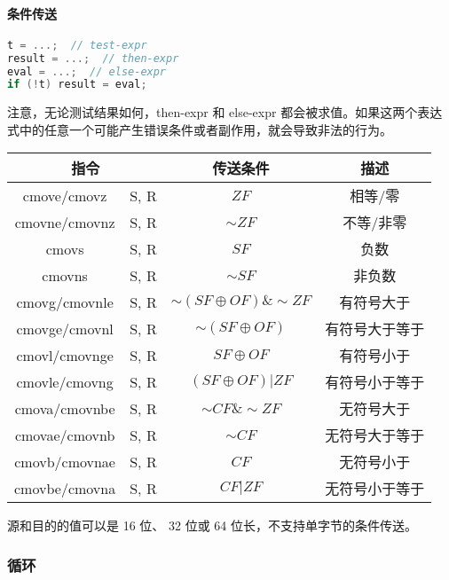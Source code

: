 \paragraph{条件传送}
\begin{lstlisting}[language=C]
t = ...;  // test-expr
result = ...;  // then-expr
eval = ...;  // else-expr
if (!t) result = eval;
\end{lstlisting}

注意，无论测试结果如何，then-expr 和 else-expr 都会被求值。如果这两个表达式中的任意一个可能产生错误条件或者副作用，就会导致非法的行为。

\begin{table}[H]
    \centering
    \begin{tabular}{|c c|c|c|}
        \hline
        \multicolumn{2}{|c|}{\textbf{指令}} & \textbf{传送条件} & \textbf{描述} \\
        \hline
        cmove/cmovz & S, R & $ZF$ & 相等/零 \\
        cmovne/cmovnz & S, R & $\sim ZF$ & 不等/非零 \\
        \hline
        cmovs & S, R & $SF$ & 负数 \\
        cmovns & S, R & $\sim SF$ & 非负数 \\
        \hline
        cmovg/cmovnle & S, R & $\sim (SF \oplus OF) \& \sim ZF$ & 有符号大于 \\
        cmovge/cmovnl & S, R & $\sim (SF \oplus OF)$ & 有符号大于等于 \\
        cmovl/cmovnge & S, R & $SF \oplus OF$ & 有符号小于 \\
        cmovle/cmovng & S, R & $(SF \oplus OF) | ZF$ & 有符号小于等于 \\
        \hline
        cmova/cmovnbe & S, R & $\sim CF \& \sim ZF$ & 无符号大于 \\
        cmovae/cmovnb & S, R & $\sim CF$ & 无符号大于等于 \\
        cmovb/cmovnae & S, R & $CF$ & 无符号小于 \\
        cmovbe/cmovna & S, R & $CF | ZF$ & 无符号小于等于 \\
        \hline
    \end{tabular}
\end{table}

源和目的的值可以是 16 位、 32 位或 64 位长，不支持单字节的条件传送。

\subsubsection{循环}
